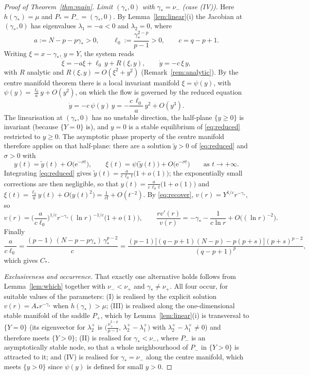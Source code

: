 \documentclass[11pt,reqno]{amsart}
\numberwithin{equation}{section}
\theoremstyle{plain}
\theoremstyle{definition}
\newcommand{\gs}{\gamma_{*}}
\begin{document}
\begin{proof}[Proof of Theorem~\ref{thm:main}]
\smallskip
\noindent\emph{Limit $(\gs,0)$ with $\gs=\nu_{-}$ (case (IV)).} Here
$h(\gs)=\mu$ and $P_{*}=P_{-}=(\gs,0)$. By Lemma~\ref{lem:linear}(i) the
Jacobian at $(\gs,0)$ has eigenvalues $\lambda_{1}=-a<0$ and $\lambda_{2}=0$,
where
\[
a:=N-p-p\gs>0,\qquad \ell_{0}:=\frac{\gs^{2-p}}{p-1}>0,\qquad c=q-p+1 .
\]
Writing $\xi=x-\gs$, $y=Y$, the system reads
\[
\dot\xi=-a\xi+\ell_{0}\,y+R(\xi,y),\qquad \dot y=-c\,\xi\,y ,
\]
with $R$ analytic and $R(\xi,y)=O(\xi^{2}+y^{2})$ (Remark~\ref{rem:analytic}).
By the centre manifold theorem \cite{Carr} there is a local invariant manifold
$\xi=\psi(y)$, with $\psi(y)=\frac{\ell_{0}}{a}y+O(y^{2})$, on which the flow is
governed by the reduced equation
\begin{equation}\label{eq:reduced}
\dot y=-c\,\psi(y)\,y=-\frac{c\,\ell_{0}}{a}\,y^{2}+O(y^{3}) .
\end{equation}
The linearisation at $(\gs,0)$ has no unstable direction, the half-plane
$\{y\ge0\}$ is invariant (because $\{Y=0\}$ is), and $y=0$ is a stable
equilibrium of \eqref{eq:reduced} restricted to $y\ge0$. The asymptotic phase
property of the centre manifold \cite{Carr} therefore applies on that
half-plane: there are a solution $\tilde y>0$ of \eqref{eq:reduced} and
$\sigma>0$ with
\[
y(t)=\tilde y(t)+O\big(\mathrm e^{-\sigma t}\big),
\qquad
\xi(t)=\psi\big(\tilde y(t)\big)+O\big(\mathrm e^{-\sigma t}\big)
\qquad\text{as }t\to+\infty .
\]
Integrating \eqref{eq:reduced} gives
$\tilde y(t)=\frac{a}{c\,\ell_{0}\,t}\big(1+o(1)\big)$; the exponentially small
corrections are then negligible, so that
$y(t)=\frac{a}{c\,\ell_{0}\,t}\big(1+o(1)\big)$ and
$\xi(t)=\frac{\ell_{0}}{a}y(t)+O\big(y(t)^{2}\big)=\frac{1}{ct}+O(t^{-2})$. By
\eqref{eq:recover}, $v(r)=Y^{1/c}r^{-\gs}$, so
\[
v(r)=\Big(\frac{a}{c\ell_{0}}\Big)^{1/c}r^{-\gs}(\ln r)^{-1/c}\big(1+o(1)\big),
\qquad
\frac{rv'(r)}{v(r)}=-\gs-\frac{1}{c\ln r}+O\big((\ln r)^{-2}\big).
\]
Finally
\[
\frac{a}{c\ell_{0}}=\frac{(p-1)\,(N-p-p\gs)\,\gs^{p-2}}{c}
=\frac{(p-1)\big[(q-p+1)(N-p)-p(p+s)\big](p+s)^{p-2}}{(q-p+1)^{p}} ,
\]
which gives $C_{*}$.

\smallskip
\noindent\emph{Exclusiveness and occurrence.} That exactly one alternative
holds follows from Lemma~\ref{lem:which} together with
$\nu_{-}<\nu_{+}$ and $\gs\ne\nu_{+}$. All four occur, for suitable values of
the parameters: (I) is realised by the
explicit solution $v(r)=A_{*}r^{-\gs}$ when $h(\gs)>\mu$; (III) is realised
along the one-dimensional stable manifold of the saddle $P_{+}$, which by
Lemma~\ref{lem:linear}(i) is transversal to $\{Y=0\}$ (its eigenvector for
$\lambda_{2}^{+}$ is
$\big(\tfrac{\nu_{+}^{2-p}}{p-1},\,\lambda_{2}^{+}-\lambda_{1}^{+}\big)$ with
$\lambda_{2}^{+}-\lambda_{1}^{+}\ne0$) and therefore meets $\{Y>0\}$; (II) is
realised for $\gs<\nu_{-}$, where $P_{-}$ is an asymptotically stable node, so
that a whole neighbourhood of $P_{-}$ in $\{Y>0\}$ is attracted to it; and (IV)
is realised for $\gs=\nu_{-}$ along the centre manifold, which meets $\{y>0\}$
since $\psi(y)$ is defined for small $y>0$.
\end{proof}
\end{document}
